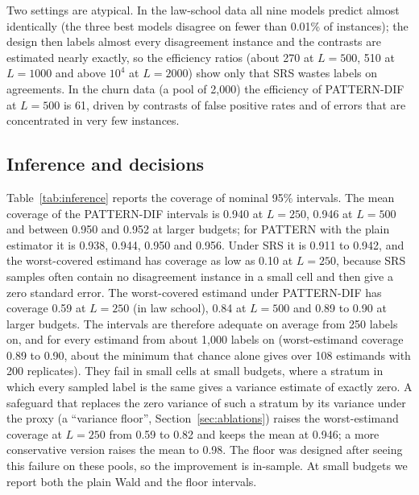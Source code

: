 Two settings are atypical. In the law-school data all nine models predict almost identically (the three best models disagree on fewer than 0.01\% of instances); the design then labels almost every disagreement instance and the contrasts are estimated nearly exactly, so the efficiency ratios (about 270 at $L=500$, 510 at $L=1000$ and above $10^{4}$ at $L=2000$) show only that SRS wastes labels on agreements. In the churn data (a pool of 2,000) the efficiency of PATTERN-DIF at $L=500$ is 61, driven by contrasts of false positive rates and of errors that are concentrated in very few instances.

\begin{table}[p]\centering\footnotesize
\caption{Efficiency (ratio of mean squared errors, median over estimands) by setting and budget. DIF plain: PATTERN-DIF with the default allocation; DIF resid: with the residual-variance allocation; StratPPI: stratified prediction-powered inference (Section~\ref{sec:baselines}). ``vs PATTERN'': PATTERN-DIF relative to the plain estimator under the same design. The last three columns are the efficiencies of PATTERN-DIF by estimand type. Bold marks the best of the two PATTERN-DIF variants.}\label{tab:efficiency}
\resizebox{\ifdim\width>\textwidth\textwidth\else\width\fi}{!}{}
\end{table}

\subsection{Inference and decisions}
Table~\ref{tab:inference} reports the coverage of nominal 95\% intervals. The mean coverage of the PATTERN-DIF intervals is 0.940 at $L=250$, 0.946 at $L=500$ and between 0.950 and 0.952 at larger budgets; for PATTERN with the plain estimator it is 0.938, 0.944, 0.950 and 0.956. Under SRS it is 0.911 to 0.942, and the worst-covered estimand has coverage as low as 0.10 at $L=250$, because SRS samples often contain no disagreement instance in a small cell and then give a zero standard error. The worst-covered estimand under PATTERN-DIF has coverage 0.59 at $L=250$ (in law school), 0.84 at $L=500$ and 0.89 to 0.90 at larger budgets. The intervals are therefore adequate on average from 250 labels on, and for every estimand from about 1,000 labels on (worst-estimand coverage 0.89 to 0.90, about the minimum that chance alone gives over 108 estimands with 200 replicates). They fail in small cells at small budgets, where a stratum in which every sampled label is the same gives a variance estimate of exactly zero. A safeguard that replaces the zero variance of such a stratum by its variance under the proxy (a ``variance floor'', Section~\ref{sec:ablations}) raises the worst-estimand coverage at $L=250$ from 0.59 to 0.82 and keeps the mean at 0.946; a more conservative version raises the mean to 0.98. The floor was designed after seeing this failure on these pools, so the improvement is in-sample. At small budgets we report both the plain Wald and the floor intervals.

